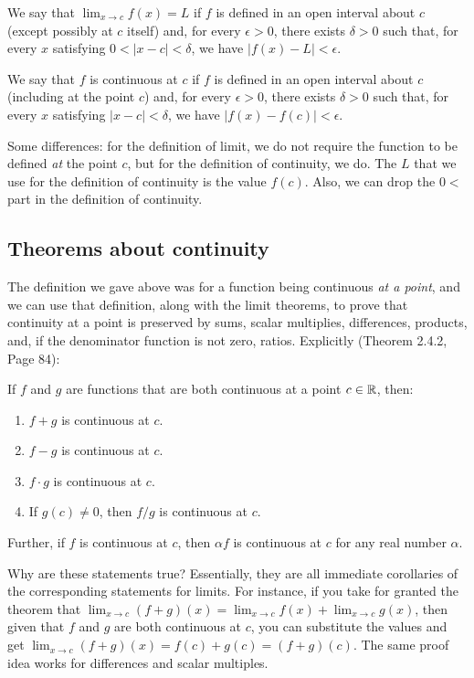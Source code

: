 \documentclass[10pt]{amsart}
\begin{document}
We say that $\lim_{x \to c} f(x) = L$ if $f$ is defined in an open
interval about $c$ (except possibly at $c$ itself) and, for every
$\epsilon > 0$, there exists $\delta > 0$ such that, for every $x$
satisfying $0 < |x - c| < \delta$, we have $|f(x) - L| < \epsilon$.

We say that $f$ is continuous at $c$ if $f$ is defined in an open
interval about $c$ (including at the point $c$) and, for every
$\epsilon > 0$, there exists $\delta > 0$ such that, for every $x$
satisfying $|x - c| < \delta$, we have $|f(x) - f(c)| < \epsilon$.

Some differences: for the definition of limit, we do not require the
function to be defined {\em at} the point $c$, but for the definition
of continuity, we do. The $L$ that we use for the definition of
continuity is the value $f(c)$. Also, we can drop the $0 <$ part in
the definition of continuity.

\subsection{Theorems about continuity}

The definition we gave above was for a function being continuous {\em
at a point}, and we can use that definition, along with the limit
theorems, to prove that continuity at a point is preserved by sums,
scalar multiplies, differences, products, and, if the denominator
function is not zero, ratios. Explicitly (Theorem 2.4.2, Page 84):

If $f$ and $g$ are functions that are both continuous at a point $c
\in \mathbb{R}$, then:

\begin{enumerate}
\item $f + g$ is continuous at $c$.
\item $f - g$ is continuous at $c$.
\item $f \cdot g$ is continuous at $c$.
\item If $g(c) \ne 0$, then $f/g$ is continuous at $c$.
\end{enumerate}

Further, if $f$ is continuous at $c$, then $\alpha f$ is continuous at
$c$ for any real number $\alpha$.

Why are these statements true? Essentially, they are all immediate
corollaries of the corresponding statements for limits. For instance, if
you take for granted the theorem that $\lim_{x \to c} (f + g)(x) =
\lim_{x \to c} f(x) + \lim_{x \to c} g(x)$, then given that $f$ and
$g$ are both continuous at $c$, you can substitute the values and get
$\lim_{x \to c} (f + g)(x) = f(c) + g(c) = (f + g)(c)$. The same proof
idea works for differences and scalar multiples.
\end{document}
